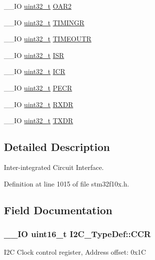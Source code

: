 \begin{DoxyCompactItemize}
\-\_\-\-\_\-\-I\-O \hyperlink{stdint_8h_a435d1572bf3f880d55459d9805097f62}{uint32\-\_\-t} \hyperlink{struct_i2_c___type_def_a73988a218be320999c74a641b3d6e3c1}{O\-A\-R2}
\item 
\-\_\-\-\_\-\-I\-O \hyperlink{stdint_8h_a435d1572bf3f880d55459d9805097f62}{uint32\-\_\-t} \hyperlink{struct_i2_c___type_def_a92514ade6721d7c8e35d95c5b5810852}{T\-I\-M\-I\-N\-G\-R}
\item 
\-\_\-\-\_\-\-I\-O \hyperlink{stdint_8h_a435d1572bf3f880d55459d9805097f62}{uint32\-\_\-t} \hyperlink{struct_i2_c___type_def_a95f1607b6254092066a3b6e35146e28a}{T\-I\-M\-E\-O\-U\-T\-R}
\item 
\-\_\-\-\_\-\-I\-O \hyperlink{stdint_8h_a435d1572bf3f880d55459d9805097f62}{uint32\-\_\-t} \hyperlink{struct_i2_c___type_def_a0f73f2b049d95841c54313f0cc949afe}{I\-S\-R}
\item 
\-\_\-\-\_\-\-I\-O \hyperlink{stdint_8h_a435d1572bf3f880d55459d9805097f62}{uint32\-\_\-t} \hyperlink{struct_i2_c___type_def_a790a1957ec69244915a9637f7d925cf7}{I\-C\-R}
\item 
\-\_\-\-\_\-\-I\-O \hyperlink{stdint_8h_a435d1572bf3f880d55459d9805097f62}{uint32\-\_\-t} \hyperlink{struct_i2_c___type_def_a64c9036c1b58778cda97efa2e8a4be97}{P\-E\-C\-R}
\item 
\-\_\-\-\_\-\-I\-O \hyperlink{stdint_8h_a435d1572bf3f880d55459d9805097f62}{uint32\-\_\-t} \hyperlink{struct_i2_c___type_def_a43d30d8efd8e4606663c7cb8d2565e12}{R\-X\-D\-R}
\item 
\-\_\-\-\_\-\-I\-O \hyperlink{stdint_8h_a435d1572bf3f880d55459d9805097f62}{uint32\-\_\-t} \hyperlink{struct_i2_c___type_def_ad243ba45c86b31cb271ccfc09c920628}{T\-X\-D\-R}
\end{DoxyCompactItemize}


\subsection{Detailed Description}
Inter-\/integrated Circuit Interface. 

Definition at line 1015 of file stm32f10x.\-h.



\subsection{Field Documentation}
\hypertarget{struct_i2_c___type_def_a1775e779008da2b4d1807c2b5033b8a5}{
\subsubsection[{C\-C\-R}]{\setlength{\rightskip}{0pt plus 5cm}\-\_\-\-\_\-\-I\-O {\bf uint16\-\_\-t} I2\-C\-\_\-\-Type\-Def\-::\-C\-C\-R}}\label{struct_i2_c___type_def_a1775e779008da2b4d1807c2b5033b8a5}
I2\-C Clock control register, Address offset\-: 0x1\-C 


